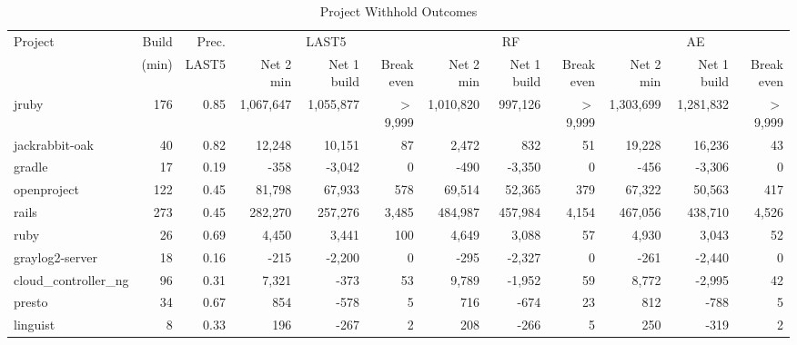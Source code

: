 \begin{table}[htbp]
\centering
\footnotesize\setlength{\tabcolsep}{2.4pt}
\caption{Project Withhold Outcomes}
\label{tab:cost_project}
\begin{tabular}{lrrrrrrrrrrr}
\toprule
Project & Build & Prec. & \multicolumn{3}{c}{LAST5} & \multicolumn{3}{c}{RF} & \multicolumn{3}{c}{AE} \\
\cmidrule(lr){4-6} \cmidrule(lr){7-9} \cmidrule(lr){10-12}
 & (min) & LAST5 & Net 2 min & Net 1 build & Break even & Net 2 min & Net 1 build & Break even & Net 2 min & Net 1 build & Break even \\
\midrule
jruby & 176 & 0.85 & 1{,}067{,}647 & 1{,}055{,}877 & $>$9{,}999 & 1{,}010{,}820 & 997{,}126 & $>$9{,}999 & 1{,}303{,}699 & 1{,}281{,}832 & $>$9{,}999 \\
jackrabbit-oak & 40 & 0.82 & 12{,}248 & 10{,}151 & 87 & 2{,}472 & 832 & 51 & 19{,}228 & 16{,}236 & 43 \\
gradle & 17 & 0.19 & -358 & -3{,}042 & 0 & -490 & -3{,}350 & 0 & -456 & -3{,}306 & 0 \\
openproject & 122 & 0.45 & 81{,}798 & 67{,}933 & 578 & 69{,}514 & 52{,}365 & 379 & 67{,}322 & 50{,}563 & 417 \\
rails & 273 & 0.45 & 282{,}270 & 257{,}276 & 3{,}485 & 484{,}987 & 457{,}984 & 4{,}154 & 467{,}056 & 438{,}710 & 4{,}526 \\
ruby & 26 & 0.69 & 4{,}450 & 3{,}441 & 100 & 4{,}649 & 3{,}088 & 57 & 4{,}930 & 3{,}043 & 52 \\
graylog2-server & 18 & 0.16 & -215 & -2{,}200 & 0 & -295 & -2{,}327 & 0 & -261 & -2{,}440 & 0 \\
cloud\_controller\_ng & 96 & 0.31 & 7{,}321 & -373 & 53 & 9{,}789 & -1{,}952 & 59 & 8{,}772 & -2{,}995 & 42 \\
presto & 34 & 0.67 & 854 & -578 & 5 & 716 & -674 & 23 & 812 & -788 & 5 \\
linguist & 8 & 0.33 & 196 & -267 & 2 & 208 & -266 & 5 & 250 & -319 & 2 \\
\bottomrule
\end{tabular}
\end{table}
